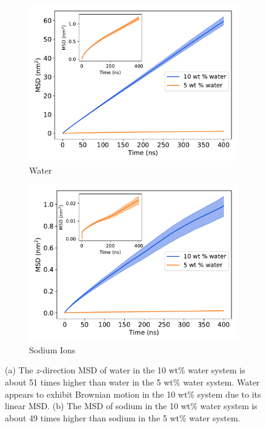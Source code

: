 \documentclass[journal=jpcbfk,manuscript=article]{achemso}
\begin{document}
  \begin{figure}[!htb]
  \centering
  \begin{subfigure}{0.45\textwidth}
  \includegraphics[width=\textwidth]{water_msd_comparison.pdf}
  \caption{Water}\label{fig:water_msd_comparison}
  \end{subfigure}
  \begin{subfigure}{0.45\textwidth}
  \includegraphics[width=\textwidth]{na_msd_comparison.pdf}
  \caption{Sodium Ions}\label{fig:na_msd_comparison}
  \end{subfigure}
  \caption{(a) The $z$-direction MSD of water in the 10 wt\% water system 
  is about 51 times higher than water in the 5 wt\% water system. Water 
  appears to exhibit Brownian motion in the 10 wt\% system due to its
  linear MSD. (b) The MSD of sodium in the 10 wt\% water system is about 
  49 times higher than sodium in the 5 wt\% water system.}\label{fig:msd_comparison}
  \end{figure}
\end{document}
